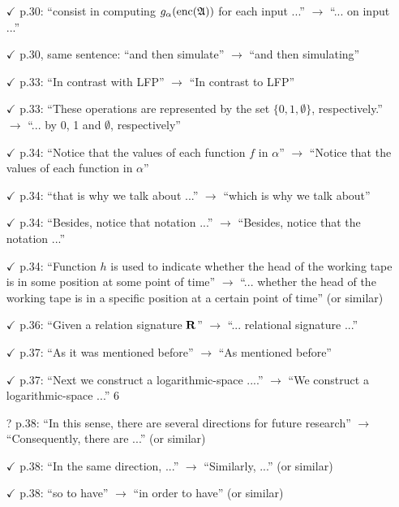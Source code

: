 \documentclass[a4paper]{article}
\begin{document}
\begin{itemize}
	\item[$\checkmark$] p.30: ``consist in computing $g_{\alpha}({\rm enc}(\mathfrak{A}))$ for each input ...'' $\to$ ``... on input ...''
	\item[$\checkmark$] p.30, same sentence: ``and then simulate'' $\to$ ``and then simulating''
	\item[$\checkmark$] p.33: ``In contrast with LFP'' $\to$ ``In contrast to LFP''
	\item[$\checkmark$] p.33: ``These operations are represented by the set $\{0,1,\emptyset\}$, respectively.'' $\to$ ``... by 0, 1 and
	$\emptyset$, respectively''
	\item[$\checkmark$] p.34: ``Notice that the values of each function $f$ in $\alpha$'' $\to$ ``Notice that the values of each
	function in $\alpha$''
	\item[$\checkmark$] p.34: ``that is why we talk about ...'' $\to$ ``which is why we talk about''
	\item[$\checkmark$] p.34: ``Besides, notice that notation ...'' $\to$ ``Besides, notice that the notation ...''
	\item[$\checkmark$] p.34: ``Function $h$ is used to indicate whether the head of the working tape is in some position
	at some point of time'' $\to$ ``... whether the head of the working tape is in a specific position
	at a certain point of time'' (or similar)
	\item[$\checkmark$] p.36: ``Given a relation signature $\mathbf{R}$'' $\to$ ``... relational signature ...''
	\item[$\checkmark$] p.37: ``As it was mentioned before'' $\to$ ``As mentioned before''
	\item[$\checkmark$] p.37: ``Next we construct a logarithmic-space ....'' $\to$ ``We construct a logarithmic-space ...''
	6
	\item[?] p.38: ``In this sense, there are several directions for future research'' $\to$ ``Consequently, there
	are ...'' (or similar)
	\item[$\checkmark$] p.38: ``In the same direction, ...'' $\to$ ``Similarly, ...'' (or similar)
	\item[$\checkmark$] p.38: ``so to have'' $\to$ ``in order to have'' (or similar)
\end{itemize}
\vspace{1em}
\end{document}
